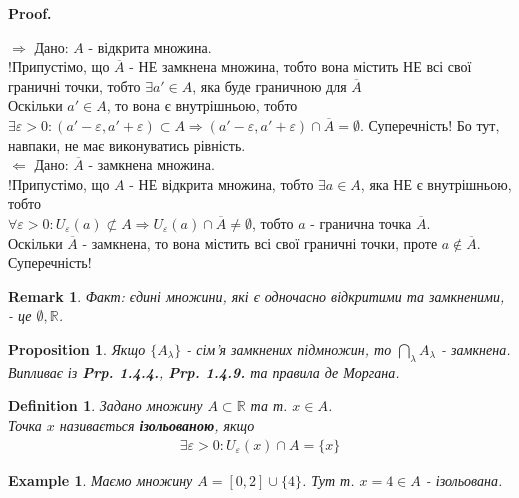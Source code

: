 \documentclass[a4paper, 14pt]{article}
\makeatletter
\def\qed{$\blacksquare$}
\def\rightproof{$\boxed{\Rightarrow}$ }
\def\leftproof{$\boxed{\Leftarrow}$ }
\theoremstyle{theoremdd}
\theoremstyle{theoremdd}
\newtheorem{definition}[theorem]{Definition}
\theoremstyle{theoremdd}
\theoremstyle{theoremdd}
\newtheorem{example}[theorem]{Example}
\theoremstyle{theoremdd}
\newtheorem{proposition}[theorem]{Proposition}
\theoremstyle{theoremdd}
\newtheorem{remark}[theorem]{Remark}
\theoremstyle{theoremdd}
\theoremstyle{theoremdd}
\renewenvironment{proof}[1][Proof.\\]{\par
\pushQED{\hfill \qed}%
\normalfont \topsep6\p@\@plus6\p@\relax
\trivlist
\item\relax
{\bfseries
#1\@addpunct{.}}\hspace\labelsep\ignorespaces
}{%
\popQED\endtrivlist\@endpefalse
}
\makeatother
\begin{document}
\begin{proof}
\rightproof Дано: $A$ - відкрита множина.\\
!Припустімо, що $\overline{A}$ - НЕ замкнена множина, тобто вона містить НЕ всі свої граничні точки, тобто $\exists a' \in A$, яка буде граничною для $\overline{A}$\\
Оскільки $a' \in A$, то вона є внутрішньою, тобто $\exists \varepsilon > 0: (a'-\varepsilon,a'+\varepsilon) \subset A \Rightarrow (a'-\varepsilon,a'+\varepsilon) \cap \overline{A} = \emptyset$. Суперечність! Бо тут, навпаки, не має виконуватись рівність.
\bigskip \\
\leftproof Дано: $\overline{A}$ - замкнена множина.\\
!Припустімо, що $A$ - НЕ відкрита множина, тобто $\exists a \in A$, яка НЕ є внутрішньою, тобто\\
$\forall \varepsilon > 0: U_{\varepsilon}(a) \not\subset A \Rightarrow U_{\varepsilon}(a) \cap \overline{A} \neq \emptyset$, тобто $a$ - гранична точка $\overline{A}$.\\
Оскільки $\overline{A}$ - замкнена, то вона містить всі свої граничні точки, проте $a \not\in \overline{A}$. Суперечність!
\end{proof}

\begin{remark}
Факт: єдині множини, які є одночасно відкритими та замкненими, - це $\emptyset, \mathbb{R}$.
\end{remark}

\begin{proposition}
Якщо $\{A_{\lambda}\}$ - сім'я замкнених підмножин, то $\displaystyle \bigcap_{\lambda} A_{\lambda}$ - замкнена.\\
\textit{Випливає із} \textbf{Prp. 1.4.4.}, \textbf{Prp. 1.4.9.} \textit{та правила де Моргана.}
\end{proposition}

\begin{definition}
Задано множину $A \subset \mathbb{R}$ та т. $x \in A$.\\
Точка $x$ називається \textbf{ізольованою}, якщо
\begin{align*}
\exists \varepsilon > 0: U_{\varepsilon}(x) \cap A = \{x\}
\end{align*}
\end{definition}

\begin{example}
Маємо множину $A = [0,2] \cup \{4\}$. Тут т. $x = 4 \in A$ - ізольована.
\begin{figure}[H]
\centering
{}

\end{figure}
\end{example}
\end{document}

